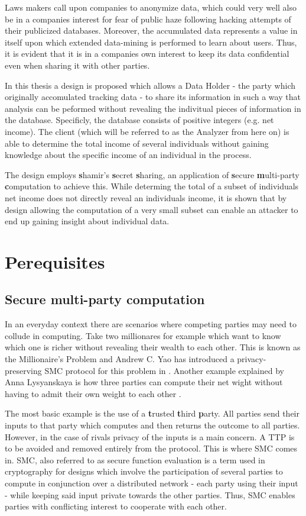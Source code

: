 \documentclass[12pt,a4paper]{scrartcl}				%
\begin{document}
Laws makers call upon companies to anonymize data, which could very well also be in a companies interest for fear of public haze following hacking attempts of their publicized databases. Moreover, the accumulated data represents a value in itself upon which extended data-mining is performed to learn about users. Thus, it is evident that it is in a companies own interest to keep its data confidential even when sharing it with other parties.

In this thesis a design is proposed which allows a Data Holder - the party which originally accomulated tracking data - to share its information in such a way that analysis can be peformed without revealing the indivitual pieces of information in the database. Specificly, the database consists of positive integers (e.g. net income). The client (which will be referred to as the Analyzer from here on) is able to determine the total income of several individuals without gaining knowledge about the specific income of an individual in the process.

The design employs \textbf{s}hamir's \textbf{s}ecret \textbf{s}haring, an application of \textbf{s}ecure \textbf{m}ulti-party \textbf{c}omputation to achieve this. While determing the total of a subset of individuals net income does not directly reveal an individuals income, it is shown that by design allowing the computation of a very small subset can enable an attacker to end up gaining insight about individual data.


\section{Perequisites}

\subsection{Secure multi-party computation}
In an everyday context there are scenarios where competing parties may need to collude in computing. Take two millionares for example which want to know which one is richer without revealing their wealth to each other. This is known as the Millionaire's Problem and Andrew C. Yao has introduced a privacy-preserving SMC protocol for this problem in \cite{yao1982protocols}. Another example explained by Anna Lysyanskaya is how three parties can compute their net wight without having to admit their own weight to each other \cite{lysyanskaya2008keep}.

The most basic example is the use of a \textbf{t}rusted \textbf{t}hird \textbf{p}arty. All parties send their inputs to that party which computes and then returns the outcome to all parties. However, in the case of rivals privacy of the inputs is a main concern. A TTP is to be avoided and removed entirely from the protocol. This is where SMC comes in. SMC, also referred to as secure function evaluation is a term used in cryptography for designs which involve the participation of several parties to compute in conjunction over a distributed network - each party using their input - while keeping said input private towards the other parties. Thus, SMC enables parties with conflicting interest to cooperate with each other. 
\end{document}
